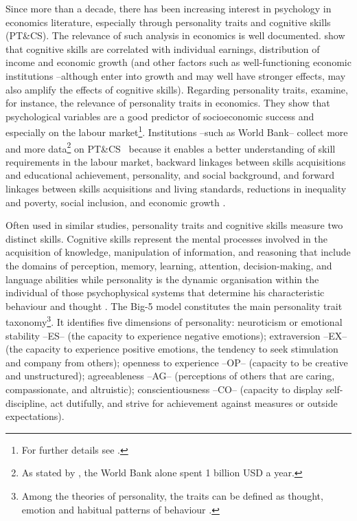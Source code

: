 \documentclass[a4paper, 11pt, onecolumn]{article}
\newcommand{\PTCS}{PT\&CS}
\begin{document}
Since more than a decade, there has been increasing interest in psychology in economics literature, especially through personality traits and cognitive skills (\PTCS).
The relevance of such analysis in economics is well documented.
\cite{Hanushek2008} show that cognitive skills are correlated with individual earnings, distribution of income and economic growth (and other factors such as well-functioning economic institutions --although enter into growth and may well have stronger effects, may also amplify the effects of cognitive skills).
Regarding personality traits, \cite{Borghans2008} examine, for instance, the relevance of personality traits in economics.
They show that psychological variables are a good predictor of socioeconomic success and especially on the labour market\footnote{For further details see \cite{Almlund2011}.}. %
Institutions --such as World Bank-- collect more and more data\footnote{As stated by \cite{Laajaj2019b}, the World Bank alone spent 1 billion USD a year.} on \PTCS~ because it enables a better understanding of skill requirements in the labour market, backward linkages between skills acquisitions and educational achievement, personality, and social background, and forward linkages between skills acquisitions and living standards, reductions in inequality and poverty, social inclusion, and economic growth \citep{STEP2014}.

Often used in similar studies, personality traits and cognitive skills measure two distinct skills.
Cognitive skills represent the mental processes involved in the acquisition of knowledge, manipulation of information, and reasoning that include the domains of perception, memory, learning, attention, decision-making, and language abilities \citep{Kiely2014} while personality is the dynamic organisation within the individual of those psychophysical systems that determine his characteristic behaviour and thought \citep{Allport1961}.
The Big-5 model constitutes the main personality trait taxonomy\footnote{Among the theories of personality, the traits can be defined as thought, emotion and habitual patterns of behaviour \citep{Kassin2003}.}.
It identifies five dimensions of personality: neuroticism or emotional stability --ES-- (the capacity to experience negative emotions); extraversion --EX-- (the capacity to experience positive emotions, the tendency to seek stimulation and company from others); openness to experience --OP-- (capacity to be creative and unstructured); agreeableness --AG-- (perceptions of others that are caring, compassionate, and altruistic); conscientiousness --CO-- (capacity to display self-discipline, act dutifully, and strive for achievement against measures or outside expectations).	
\end{document}
